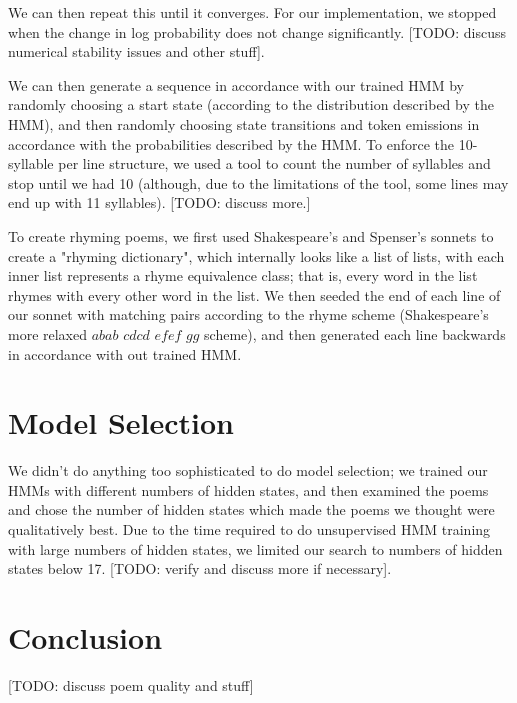 We can then repeat this until it converges. For our implementation, we stopped when the change in log probability does not change significantly. [TODO: discuss numerical stability issues and other stuff].
\par We can then generate a sequence in accordance with our trained HMM by randomly choosing a start state (according to the distribution described by the HMM), and then randomly choosing state transitions and token emissions in accordance with the probabilities described by the HMM. To enforce the 10-syllable per line structure, we used a tool to count the number of syllables and stop until we had 10 (although, due to the limitations of the tool, some lines may end up with 11 syllables). [TODO: discuss more.]
\par To create rhyming poems, we first used Shakespeare's and Spenser's sonnets to create a "rhyming dictionary", which internally looks like a list of lists, with each inner list represents a rhyme equivalence class; that is, every word in the list rhymes with every other word in the list. We then seeded the end of each line of our sonnet with matching pairs according to the rhyme scheme (Shakespeare's more relaxed $abab$ $cdcd$ $efef$ $gg$ scheme), and then generated each line backwards in accordance with out trained HMM.

\section{Model Selection}
We didn't do anything too sophisticated to do model selection; we trained our HMMs with different numbers of hidden states, and then examined the poems and chose the number of hidden states which made the poems we thought were qualitatively best. Due to the time required to do unsupervised HMM training with large numbers of hidden states, we limited our search to numbers of hidden states below 17. [TODO: verify and discuss more if necessary].

\section{Conclusion}
[TODO: discuss poem quality and stuff]



